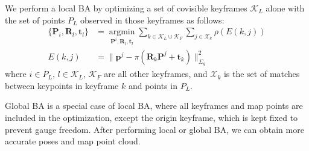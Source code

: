 We perform a local BA by optimizing a set of covisible keyframes $\mathcal{K}_L$ alone with the set of points ${P}_L$ observed in those keyframes  as follows:
\begin{align}
\{\mathrm{\mathbf{P}}_i,\mathrm{\mathbf{R}}_l,\mathrm{\mathbf{t}}_l\}&= \mathop{\mathrm{argmin}}\limits_{\mathrm{\mathbf{P}}^i,\mathrm{\mathbf{R}}_l,\mathrm{\mathbf{t}}_l} \sum_{k\in \mathcal{K}_L\cup \mathcal{K}_F}  \sum_{j\in \mathcal{X}_k} \rho(E(k,j)) \\
E(k,j) &= \|\mathrm{\mathbf{p}}^j - \pi(\mathrm{\mathbf{R}}_k\mathrm{\mathbf{P}}^j+\mathrm{\mathbf{t}}_k) \|^2_{\Sigma_g}
\end{align}
where $i\in {P}_L$, $l\in \mathcal{K}_L$, $\mathcal{K}_F$ are all other keyframes, and $\mathcal{X}_k$ is the set of matches between keypoints in keyframe $k$ and points in ${P}_L$. 

Global BA is a special case of local BA, where all keyframes and map points are included in the optimization, except the origin keyframe, which is kept fixed to prevent gauge freedom. After performing local or global BA, we can obtain more accurate poses and map point cloud.  %

